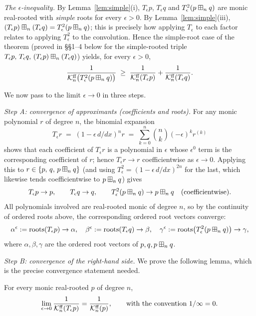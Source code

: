 \medskip
\noindent\textit{The $\epsilon$-inequality.}
By Lemma~\ref{lem:simple}(i), $T_\epsilon p$, $T_\epsilon q$ and
$T_\epsilon^2(p\boxplus_n q)$ are monic real-rooted with \emph{simple} roots for
every $\epsilon>0$. By Lemma~\ref{lem:simple}(iii),
$(T_\epsilon p)\boxplus_n(T_\epsilon q)=T_\epsilon^2(p\boxplus_n q)$; this is precisely
how applying $T_\epsilon$ to each factor relates to applying $T_\epsilon^2$ to the
convolution. Hence the simple-root case of the theorem (proved in §§1--4 below
for the simple-rooted triple $T_\epsilon p,\,T_\epsilon q,\,(T_\epsilon p)\boxplus_n(T_\epsilon q)$)
yields, for every $\epsilon>0$,
\begin{equation}\label{eq:eps-ineq}
\frac{1}{\mathcal{K}^{\mathrm{ff}}_n\bigl(T_\epsilon^2(p\boxplus_n q)\bigr)}\;\ge\;
\frac{1}{\mathcal{K}^{\mathrm{ff}}_n(T_\epsilon p)}+\frac{1}{\mathcal{K}^{\mathrm{ff}}_n(T_\epsilon q)}.
\end{equation}

We now pass to the limit $\epsilon\to 0$ in three steps.

\medskip
\noindent\textit{Step A: convergence of approximants (coefficients and roots).}
For any monic polynomial $r$ of degree $n$, the binomial expansion
\[
T_\epsilon r \;=\; (1-\epsilon\,d/dx)^n r \;=\; \sum_{k=0}^{n}\binom{n}{k}(-\epsilon)^k r^{(k)}
\]
shows that each coefficient of $T_\epsilon r$ is a polynomial in $\epsilon$ whose
$\epsilon^0$ term is the corresponding coefficient of $r$; hence
$T_\epsilon r\to r$ coefficientwise as $\epsilon\to 0$. Applying this to
$r\in\{p,\,q,\,p\boxplus_n q\}$ (and using $T_\epsilon^2=(1-\epsilon\,d/dx)^{2n}$ for
the last, which likewise tends coefficientwise to $p\boxplus_n q$) gives
\[
T_\epsilon p\to p,\qquad T_\epsilon q\to q,\qquad T_\epsilon^2(p\boxplus_n q)\to p\boxplus_n q
\quad\text{(coefficientwise).}
\]
All polynomials involved are real-rooted monic of degree $n$, so by the
continuity of ordered roots above, the corresponding ordered root vectors
converge:
\[
\alpha^\epsilon:=\mathrm{roots}(T_\epsilon p)\to\alpha,\quad
\beta^\epsilon:=\mathrm{roots}(T_\epsilon q)\to\beta,\quad
\gamma^\epsilon:=\mathrm{roots}\bigl(T_\epsilon^2(p\boxplus_n q)\bigr)\to\gamma,
\]
where $\alpha,\beta,\gamma$ are the ordered root vectors of $p,q,p\boxplus_n q$.

\medskip
\noindent\textit{Step B: convergence of the right-hand side.}
We prove the following lemma, which is the precise convergence statement needed.

\begin{qfourlemma}\label{lem:Bconv}
For every monic real-rooted $p$ of degree $n$,
\[
\lim_{\epsilon\to 0}\frac{1}{\mathcal{K}^{\mathrm{ff}}_n(T_\epsilon p)}=\frac{1}{\mathcal{K}^{\mathrm{ff}}_n(p)},
\qquad\text{with the convention }1/\infty=0 .
\]
\end{qfourlemma}

